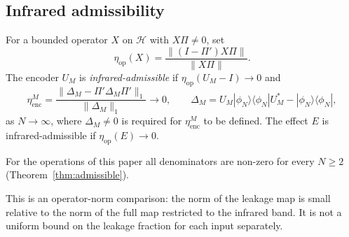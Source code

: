 \subsection{Infrared admissibility}
\begin{definition}\label{def:admissible}
For a bounded operator $X$ on $\mathcal H$ with $X\Pi\ne0$, set
\[
\eta_{\mathrm{op}}(X)=\frac{\|(I-\Pi')X\Pi\|}{\|X\Pi\|}.
\]
The encoder $U_M$ is \emph{infrared-admissible} if
$\eta_{\mathrm{op}}(U_M-I)\to0$ and
\[
\eta_{\mathrm{enc}}^M=\frac{\|\Delta_M-\Pi'\Delta_M\Pi'\|_1}{\|\Delta_M\|_1}\to0,
\qquad \Delta_M=U_M|\phi_N\rangle\langle\phi_N|U_M^*-|\phi_N\rangle\langle\phi_N|,
\]
as $N\to\infty$, where $\Delta_M\ne0$ is required for $\eta_{\mathrm{enc}}^M$
to be defined.  The effect $E$ is infrared-admissible if
$\eta_{\mathrm{op}}(E)\to0$.
\end{definition}

For the operations of this paper all denominators are non-zero for every
$N\ge2$ (Theorem~\ref{thm:admissible}).

This is an operator-norm comparison: the norm of the leakage map is small
relative to the norm of the full map restricted to the infrared band.
It is not a uniform bound on the leakage fraction for each input separately.

